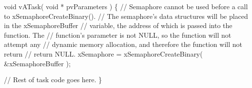 \begin{DoxyPre}void vATask( void * pvParameters )
\{
   // Semaphore cannot be used before a call to xSemaphoreCreateBinary().
   // The semaphore's data structures will be placed in the xSemaphoreBuffer
   // variable, the address of which is passed into the function.  The
   // function's parameter is not NULL, so the function will not attempt any
   // dynamic memory allocation, and therefore the function will not return
   // return NULL.
   xSemaphore = xSemaphoreCreateBinary( &xSemaphoreBuffer );\end{DoxyPre}



\begin{DoxyPre}   // Rest of task code goes here.
\}
\end{DoxyPre}
 